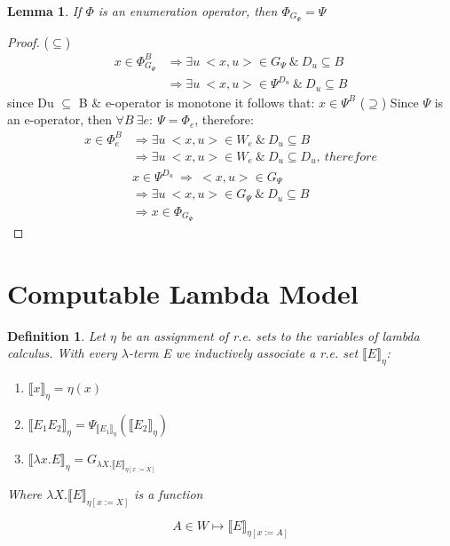 \documentclass{article}
\newtheorem{lemma}[theorem]{Lemma} %
\newtheorem{definition}{Definition}[section] %
\begin{document}
	\begin{lemma}
		If $\Phi$ is an enumeration operator, then $\Phi_{G_{\Psi}} = \Psi$
	\end{lemma}	
	\begin{proof}
		($\subseteq$)
		\begin{equation*}
		\begin{split}
			x \in \Phi_{G_\Psi}^B &\Rightarrow \exists u \: 
				<x, u> \in G_\Psi \:\&\: D_u \subseteq B\\
			&\Rightarrow \exists u \: 
				<x, u> \in \Psi^{D_u} \:\&\: D_u \subseteq B 
		\end{split}
		\end{equation*}
		\qquad since Du $\subseteq$ B \& e-operator is monotone 
		it follows that: $x \in \Psi^B$
		\newline
		($\supseteq$)
		\newline
		Since $\Psi$ is an e-operator, then 
		$\forall B \: \exists e:\: \Psi = \Phi_e$, therefore:
		\begin{equation*}
		\begin{split}
			x \in \Phi_e^B &\Rightarrow \exists u \: 
				<x, u> \in W_e \:\&\: D_u \subseteq B\\
			&\Rightarrow \exists u \: 
				<x, u> \in W_e \:\&\: D_u \subseteq D_u,\:therefore\\
			&x \in \Psi^{D_u} \:\Rightarrow\: <x, u> \in G_\Psi\\
			&\Rightarrow \exists u \: 
				<x, u> \in G_\Psi \:\&\: D_u \subseteq B\\
			&\Rightarrow x \in \Phi_{G_\Psi}
		\end{split}
		\end{equation*}

	\end{proof}

	\section{Computable Lambda Model}
	\begin{definition}
		Let $\eta$ be an assignment of r.e. sets to the variables of 
		lambda calculus. With every $\lambda$-term E we inductively 
		associate a r.e. set $\llbracket E \rrbracket_{\eta}$:
			\begin{enumerate}
				\item $\llbracket x \rrbracket_{\eta} = \eta (x)$
				\item $\llbracket E_1 E_2 \rrbracket_{\eta} = 
					\Psi_{\llbracket E_1 \rrbracket_\eta} 
					(\llbracket E_2 \rrbracket_\eta)$
				\item $\llbracket \lambda x.E \rrbracket_{\eta} = 
					G_{\lambda X. \llbracket E \rrbracket_{\eta [x := X]}}$
			\end{enumerate}
			Where $\lambda X. \llbracket E \rrbracket_{\eta [x := X]}$ is a function

		\begin{equation}
			A \in W \mapsto \llbracket E \rrbracket_{\eta [x := A]}
		\end{equation}
	\end{definition}
\end{document}
